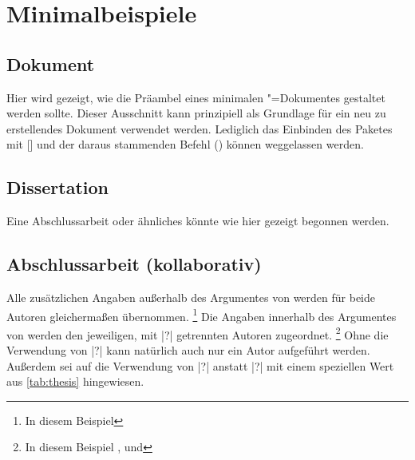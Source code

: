 \chapter{Minimalbeispiele}
%
\section{Dokument}
%
%
Hier wird gezeigt, wie die Präambel eines minimalen "=Dokumentes 
gestaltet werden sollte. Dieser Ausschnitt kann prinzipiell als Grundlage für 
ein neu zu erstellendes Dokument verwendet werden. Lediglich das Einbinden des 
Paketes  mit [] und 
der daraus stammenden Befehl () können 
weggelassen werden.



\section{Dissertation}
%
%
%
Eine Abschlussarbeit oder ähnliches könnte wie hier gezeigt begonnen werden.



\section{Abschlussarbeit (kollaborativ)}
%
%
%
%
Alle zusätzlichen Angaben außerhalb des Argumentes von  werden 
für beide Autoren gleichermaßen übernommen.%
\footnote{In diesem Beispiel }
Die Angaben innerhalb des Argumentes von  werden den jeweiligen, 
mit |?| getrennten Autoren zugeordnet.%
\footnote{%
  In diesem Beispiel ,  und 
}
Ohne die Verwendung von |?| kann natürlich auch nur ein Autor 
aufgeführt werden. Außerdem sei auf die Verwendung von |?| 
anstatt |?| mit einem speziellen Wert aus \autoref{tab:thesis} 
hingewiesen.



